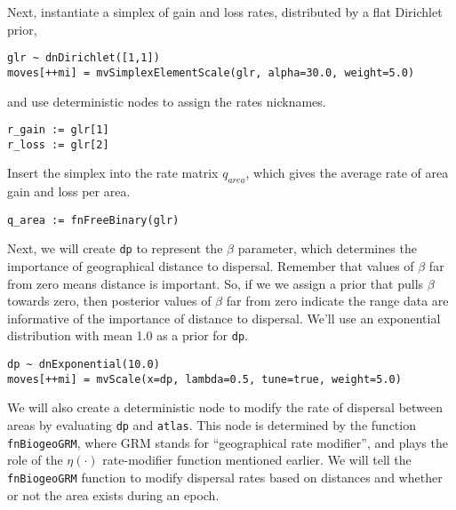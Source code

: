 Next, instantiate a simplex of gain and loss rates, distributed by a flat Dirichlet prior,

\begin{snugshade}
\begin{lstlisting}
glr ~ dnDirichlet([1,1])
moves[++mi] = mvSimplexElementScale(glr, alpha=30.0, weight=5.0)
\end{lstlisting}
\end{snugshade}

and use deterministic nodes to assign the rates nicknames.

\begin{snugshade}
\begin{lstlisting}
r_gain := glr[1]
r_loss := glr[2]
\end{lstlisting}
\end{snugshade}

Insert the simplex into the rate matrix {\tt $q_{area}$}, which gives the average rate of area gain and loss per area.

\begin{snugshade}
\begin{lstlisting}
q_area := fnFreeBinary(glr)
\end{lstlisting}
\end{snugshade}

Next, we will create {\tt dp} to represent the $\beta$ parameter, which determines the importance of geographical distance to dispersal.
Remember that values of $\beta$ far from zero means distance is important.
So, if we we assign a prior that pulls $\beta$ towards zero, then posterior values of $\beta$ far from zero indicate the range data are informative of the importance of distance to dispersal.
We'll use an exponential distribution with mean 1.0 as a prior for {\tt dp}.

\begin{snugshade}
\begin{lstlisting}
dp ~ dnExponential(10.0)
moves[++mi] = mvScale(x=dp, lambda=0.5, tune=true, weight=5.0)
\end{lstlisting}
\end{snugshade}

We will also create a deterministic node to modify the rate of dispersal between areas by evaluating {\tt dp} and {\tt atlas}.
This node is determined by the function {\tt fnBiogeoGRM}, where GRM stands for ``geographical rate modifier'', and plays the role of the $\eta(\cdot)$ rate-modifier function mentioned earlier.
We will tell the {\tt fnBiogeoGRM} function to modify dispersal rates based on distances and whether or not the area exists during an epoch.

